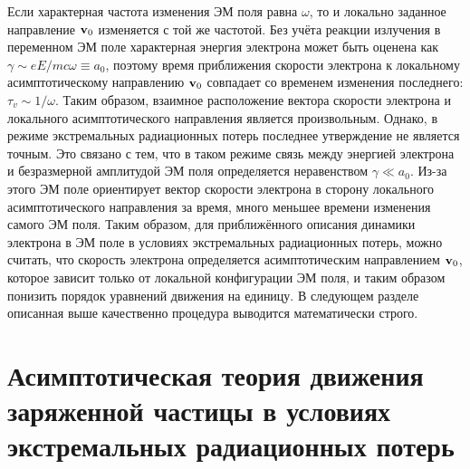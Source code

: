 Если характерная частота изменения ЭМ поля равна $\omega$, то и локально заданное направление $\vb{v}_0$ изменяется с той же частотой.
Без учёта реакции излучения в переменном ЭМ поле характерная энергия электрона может быть оценена как $\gamma\sim eE/mc\omega\equiv a_0$, поэтому время приближения скорости электрона к локальному асимптотическому направлению $\vb{v}_0$ совпадает со временем изменения последнего: $\tau_v\sim 1/\omega$.
Таким образом, взаимное расположение вектора скорости электрона и локального асимптотического направления является произвольным.
Однако, в режиме экстремальных радиационных потерь последнее утверждение не является точным.
Это связано с тем, что в таком режиме связь между энергией электрона и безразмерной амплитудой ЭМ поля определяется неравенством $\gamma \ll a_0$.
Из-за этого ЭМ поле ориентирует вектор скорости электрона в сторону локального асимптотического направления за время, много меньшее времени изменения самого ЭМ поля.
Таким образом, для приближённого описания динамики электрона в ЭМ поле в условиях экстремальных радиационных потерь, можно считать, что скорость электрона определяется асимптотическим направлением $\vb{v}_0$, которое зависит только от локальной конфигурации ЭМ поля, и таким образом понизить порядок уравнений движения на единицу.
В следующем разделе описанная выше качественно процедура выводится математически строго.

\section{Асимптотическая теория движения заряженной частицы в условиях экстремальных радиационных потерь}
\label{sec:ch1/sec2}

